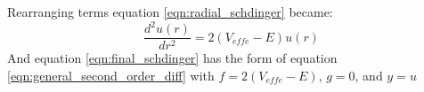 \documentclass[11pt]{article}
\begin{document}
Rearranging terms equation \ref*{eqn:radial_schdinger} became:
\begin{equation}
\label{eqn:final_schdinger}
    \frac{d^2 u(r)}{dr^2} = 2 (V_{effe} - E)  u(r)
\end{equation}
And equation \ref*{eqn:final_schdinger} has the form of equation \ref*{eqn:general_second_order_diff}
with $f = 2 (V_{effe} - E)$, $g = 0$, and $y = u$
\end{document}
